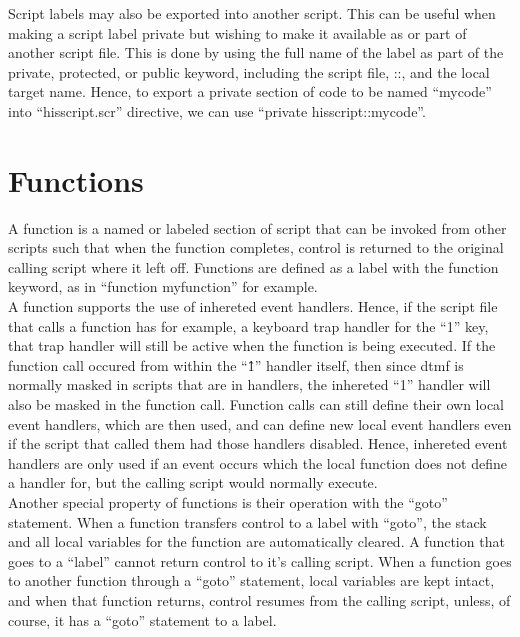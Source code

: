 \documentclass[a4paper,12pt]{article}
\begin{document}
Script labels may also be exported into another script.  This can be
useful when making a script label private but wishing to make it
available as or part of another script file.  This is done by using the
full name of the label as part of the private, protected, or public
keyword, including the script file, ::, and the local target name. 
Hence, to export a private section of code to be named ``mycode'' into
``hisscript.scr'' directive, we can use ``private hisscript::mycode''. \\

\section{Functions}

A function is a named or labeled section of script that can be invoked 
from other scripts such that when the function completes, control is 
returned to the original calling script where it left off.  Functions 
are defined as a label with the function keyword, as in ``function 
myfunction'' for example. \\

A function supports the use of inhereted event handlers.  Hence, if the
script file that calls a function has for example, a keyboard trap
handler for the ``1'' key, that trap handler will still be active when
the function is being executed.  If the function call occured from
within the ``\^1'' handler itself, then since dtmf is normally masked in 
scripts that are in handlers, the inhereted ``1'' handler will also be 
masked in the function call.  Function calls can still define their own 
local event handlers, which are then used, and can define new local 
event handlers even if the script that called them had those handlers 
disabled.  Hence, inhereted event handlers are only used if an event 
occurs which the local function does not define a handler for, but the 
calling script would normally execute. \\

Another special property of functions is their operation with the 
``goto'' statement.  When a function transfers control to a label with 
``goto'', the stack and all local variables for the function are 
automatically cleared.  A function that goes to a ``label'' cannot 
return control to it's calling script.  When a function goes to another 
function through a ``goto'' statement, local variables are kept intact, 
and when that function returns, control resumes from the calling script, 
unless, of course, it has a ``goto'' statement to a label. \\
\end{document}
